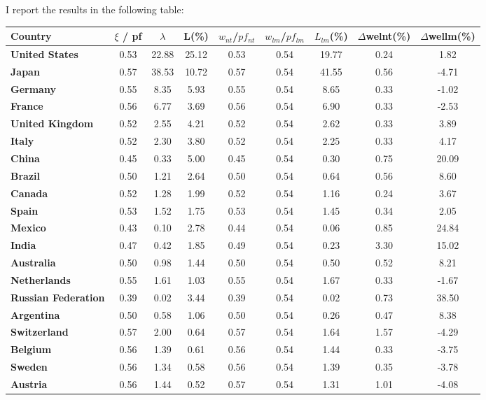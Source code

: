 \documentclass{article}
\begin{document}
I report the results in the following table:
\begin{center}
\begin{table}
\begin{small}
\begin{tabular}{|l|c|c|c|c|c|c|c|c|}
\hline
\textbf{Country} & $\xi$ / pf & $\lambda$ & L(\%) & $w_{nt}$/$pf_{nt}$ & $w_{lm}$/$pf_{lm}$ & $L_{lm}$(\%) & $\Delta$welnt(\%) & $\Delta$wellm(\%)\\ \hline
\textbf{United States}&0.53&22.88&25.12&0.53&0.54&19.77&0.24&1.82\\\hline
\textbf{Japan}&0.57&38.53&10.72&0.57&0.54&41.55&0.56&-4.71\\\hline
\textbf{Germany}&0.55&8.35&5.93&0.55&0.54&8.65&0.33&-1.02\\\hline
\textbf{France}&0.56&6.77&3.69&0.56&0.54&6.90&0.33&-2.53\\\hline
\textbf{United Kingdom}&0.52&2.55&4.21&0.52&0.54&2.62&0.33&3.89\\\hline
\textbf{Italy}&0.52&2.30&3.80&0.52&0.54&2.25&0.33&4.17\\\hline
\textbf{China}&0.45&0.33&5.00&0.45&0.54&0.30&0.75&20.09\\\hline
\textbf{Brazil}&0.50&1.21&2.64&0.50&0.54&0.64&0.56&8.60\\\hline
\textbf{Canada}&0.52&1.28&1.99&0.52&0.54&1.16&0.24&3.67\\\hline
\textbf{Spain}&0.53&1.52&1.75&0.53&0.54&1.45&0.34&2.05\\\hline
\textbf{Mexico}&0.43&0.10&2.78&0.44&0.54&0.06&0.85&24.84\\\hline
\textbf{India}&0.47&0.42&1.85&0.49&0.54&0.23&3.30&15.02\\\hline
\textbf{Australia}&0.50&0.98&1.44&0.50&0.54&0.50&0.52&8.21\\\hline
\textbf{Netherlands}&0.55&1.61&1.03&0.55&0.54&1.67&0.33&-1.67\\\hline
\textbf{Russian Federation}&0.39&0.02&3.44&0.39&0.54&0.02&0.73&38.50\\\hline
\textbf{Argentina}&0.50&0.58&1.06&0.50&0.54&0.26&0.47&8.38\\\hline
\textbf{Switzerland}&0.57&2.00&0.64&0.57&0.54&1.64&1.57&-4.29\\\hline
\textbf{Belgium}&0.56&1.39&0.61&0.56&0.54&1.44&0.33&-3.75\\\hline
\textbf{Sweden}&0.56&1.34&0.58&0.56&0.54&1.39&0.35&-3.78\\\hline
\textbf{Austria}&0.56&1.44&0.52&0.57&0.54&1.31&1.01&-4.08\\\hline

\end{tabular}
\end{small}
\end{table}
\end{center}
\end{document}
